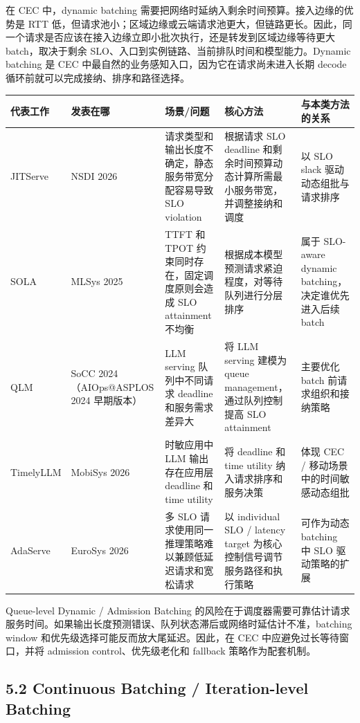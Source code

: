 \documentclass[a4paper,10pt]{ctexart}
\begin{document}
在 CEC 中，dynamic batching 需要把网络时延纳入剩余时间预算。接入边缘的优势是 RTT 低，但请求池小；区域边缘或云端请求池更大，但链路更长。因此，同一个请求是否应该在接入边缘立即小批次执行，还是转发到区域边缘等待更大 batch，取决于剩余 SLO、入口到实例链路、当前排队时间和模型能力。Dynamic batching 是 CEC 中最自然的业务感知入口，因为它在请求尚未进入长期 decode 循环前就可以完成接纳、排序和路径选择。


\begin{table}[H]
\centering
\scriptsize
\setlength{\tabcolsep}{3pt}
\renewcommand{\arraystretch}{1.15}
\begin{tabularx}{\textwidth}{|X|X|X|X|X|}
\hline
\textbf{代表工作} & \textbf{发表在哪} & \textbf{场景/问题} & \textbf{核心方法} & \textbf{与本类方法的关系} \\ \hline
JITServe & NSDI 2026 & 请求类型和输出长度不确定，静态服务带宽分配容易导致 SLO violation & 根据请求 SLO deadline 和剩余时间预算动态计算所需最小服务带宽，并调整接纳和调度 & 以 SLO slack 驱动动态组批与请求排序 \\ \hline
SOLA & MLSys 2025 & TTFT 和 TPOT 约束同时存在，固定调度原则会造成 SLO attainment 不均衡 & 根据成本模型预测请求紧迫程度，对等待队列进行分层排序 & 属于 SLO-aware dynamic batching，决定谁优先进入后续 batch \\ \hline
QLM & SoCC 2024（AIOps@ASPLOS 2024 早期版本） & LLM serving 队列中不同请求 deadline 和服务需求差异大 & 将 LLM serving 建模为 queue management，通过队列控制提高 SLO attainment & 主要优化 batch 前请求组织和接纳策略 \\ \hline
TimelyLLM & MobiSys 2026 & 时敏应用中 LLM 输出存在应用层 deadline 和 time utility & 将 deadline 和 time utility 纳入请求排序和服务决策 & 体现 CEC / 移动场景中的时间敏感动态组批 \\ \hline
AdaServe & EuroSys 2026 & 多 SLO 请求使用同一推理策略难以兼顾低延迟请求和宽松请求 & 以 individual SLO / latency target 为核心控制信号调节服务路径和执行策略 & 可作为动态 batching 中 SLO 驱动策略的扩展 \\ \hline
\end{tabularx}
\end{table}




Queue-level Dynamic / Admission Batching 的风险在于调度器需要可靠估计请求服务时间。如果输出长度预测错误、队列状态滞后或网络时延估计不准，batching window 和优先级选择可能反而放大尾延迟。因此，在 CEC 中应避免过长等待窗口，并将 admission control、优先级老化和 fallback 策略作为配套机制。


\subsection*{5.2 Continuous Batching / Iteration-level Batching}
\end{document}
